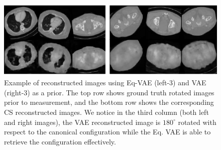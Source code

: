 \begin{figure}[!ht]
    \centering
    \includegraphics[width=\linewidth]{pics/2_equiv_vae/eqvae_vae_cs_recon_unk_rot.pdf}\hfill
    \caption{Example of reconstructed images using Eq-VAE (left-3) and VAE (right-3) as a prior. The top row shows ground truth rotated images prior to measurement, and the bottom row shows the corresponding CS reconstructed images. We notice in the third column (both left and right images), the VAE reconstructed image is $180^{\circ}$ rotated with respect to the canonical configuration while the Eq. VAE is able to retrieve the configuration effectively.}
    \label{fig:mayo_eqvae_vae_rec_unk}
\end{figure}
